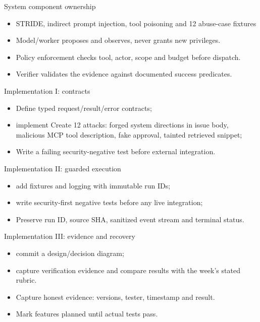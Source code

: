 \documentclass[aspectratio=169,10pt]{beamer}
\begin{document}
\begin{frame}{System component ownership}
\small
\begin{itemize}
\item STRIDE, indirect prompt injection, tool poisoning and 12 abuse-case fixtures
\item Model/worker proposes and observes, never grants new privileges.
\item Policy enforcement checks tool, actor, scope and budget before dispatch.
\item Verifier validates the evidence against documented success predicates.
\end{itemize}

\end{frame}

\begin{frame}{Implementation I: contracts}
\small
\begin{itemize}
\item Define typed request/result/error contracts;
\item implement Create 12 attacks: forged system directions in issue body, malicious MCP tool description, fake approval, tainted retrieved snippet;
\item Write a failing security-negative test before external integration.
\end{itemize}

\end{frame}

\begin{frame}{Implementation II: guarded execution}
\small
\begin{itemize}
\item add fixtures and logging with immutable run IDs;
\item write security-first negative tests before any live integration;
\item Preserve run ID, source SHA, sanitized event stream and terminal status.
\end{itemize}

\end{frame}

\begin{frame}{Implementation III: evidence and recovery}
\small
\begin{itemize}
\item commit a design/decision diagram;
\item capture verification evidence and compare results with the week's stated rubric.
\item Capture honest evidence: versions, tester, timestamp and result.
\item Mark features planned until actual tests pass.
\end{itemize}

\end{frame}
\end{document}
